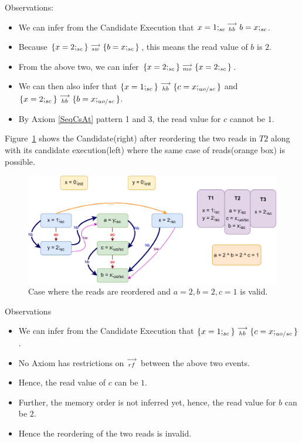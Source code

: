         Observations:
        \begin{itemize}
            \item We can infer from the Candidate Execution that $x=1;_{sc}\stackrel{\longrightarrow}{_{hb}}b=x;_{sc}$.
            \item Because $\{x=2;_{sc}\}\stackrel{\longrightarrow}{_{sw}}\{b=x;_{sc}\}$, this means the read value of $b$ is $2$.
            \item From the above two, we can infer $\{x=2;_{sc}\}\stackrel{\longrightarrow}{_{mo}}\{x=2;_{sc}\}$.
            \item We can then also infer that $\{x=1;_{sc}\}\stackrel{\longrightarrow}{_{hb}}\{c=x;_{uo/sc}\}$ and $\{x=2;_{sc}\}\stackrel{\longrightarrow}{_{hb}}\{b=x;_{uo/sc}\}$.
            \item By Axiom \ref{SeqCsAt} pattern 1 and 3, the read value for $c$ cannot be $1$.
        \end{itemize}

        Figure~\ref{reord_counter:example1(b)} shows the Candidate(right) after reordering the two reads in $T2$ along with its candidate execution(left) where the same case of reads(orange box) is possible. 
        \begin{figure}[H]
            \centering
            \includegraphics[scale=0.7]{5.InstructionReordering/4.ValidReorderingCandidate/Example0R(Rsc-Ruo,sc).pdf}
            \caption{Case where the reads are reordered and $a = 2 , b = 2, c = 1$ is valid.}
            \label{reord_counter:example1(b)}
        \end{figure}

        Observations
        \begin{itemize}
            \item We can infer from the Candidate Execution that $\{x=1;_{sc}\}\stackrel{\longrightarrow}{_{hb}}\{c=x;_{uo/sc}\}$.
            \item No Axiom has restrictions on $\stackrel{\longrightarrow}{_{rf}}$ between the above two events.
            \item Hence, the read value of $c$ can be $1$.
            \item Further, the memory order is not inferred yet\footnotemark, hence, the read value for $b$ can be $2$.
            \item Hence the reordering of the two reads is invalid. 
        \end{itemize}


